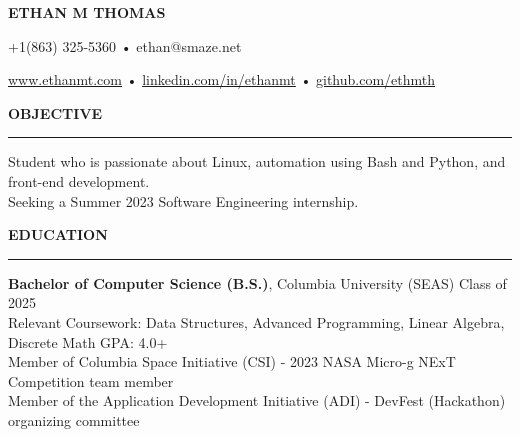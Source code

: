\documentclass[10pt,letterpaper]{article}
\begin{document}
\begingroup
    \centerline{\MakeUppercase{\LARGE\bf Ethan M Thomas}}
    \medskip
\endgroup

\begingroup
\centerline{+1(863) 325-5360 • ethan@smaze.net}
\endgroup
\par

\begingroup
\centerline{\href{www.ethanmt.com}{www.ethanmt.com} • \href{https://www.linkedin.com/in/ethanmt/}{linkedin.com/in/ethanmt} • \href{https://github.com/ethmth}{github.com/ethmth}}
\endgroup
\par


\medskip
\MakeUppercase{{\bf Objective}} %
\medskip
\hrule %
\begin{list}{}{\setlength{\leftmargin}{0em}}
\item 
    {Student who is passionate about Linux, automation using Bash and Python, and front-end development. 
    \\ Seeking a Summer 2023 Software Engineering internship.}
\end{list}


\medskip
\MakeUppercase{{\bf Education}} %
\medskip
\hrule %
\begin{list}{}{\setlength{\leftmargin}{0em}}
\item 
{\bf Bachelor of Computer Science (B.S.)}, Columbia University (SEAS) \hfill  {Class of 2025}\\
Relevant Coursework: Data Structures, Advanced Programming, Linear Algebra, Discrete Math \hfill {GPA: 4.0+}
\medskip
\\
Member of Columbia Space Initiative (CSI) - 2023 NASA Micro-g NExT Competition team member \\ 
Member of the Application Development Initiative (ADI) - DevFest (Hackathon) organizing committee
\end{list}


\end{document}
